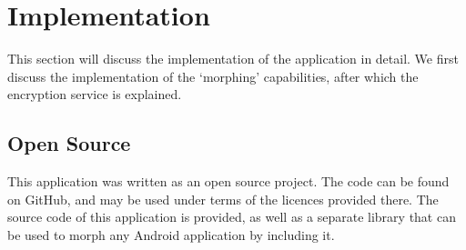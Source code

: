 \section{Implementation}
\label{sec:implementation}

This section will discuss the implementation of the application in detail. 
We first discuss the implementation of the `morphing' capabilities, after which the encryption service is explained.









\subsection{Open Source}
This application was written as an open source project.
The code can be found on GitHub\cite{githubSource}, and may be used under terms of the licences provided there.
The source code of this application is provided, as well as a separate library that can be used to morph any Android application by including it.
